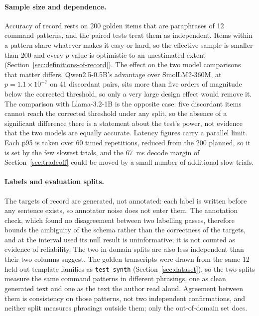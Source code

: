 \paragraph{Sample size and dependence.} Accuracy of record rests on 200 golden items that are
paraphrases of 12 command patterns, and the paired tests treat them as independent. Items within a
pattern share whatever makes it easy or hard, so the effective sample is smaller than 200 and every
$p$-value is optimistic to an unestimated extent (Section~\ref{sec:definitions-of-record}). The
effect on the two model comparisons that matter differs. Qwen2.5-0.5B's advantage over
SmolLM2-360M, at $p = 1.1 \times 10^{-7}$ on 41 discordant pairs, sits more than five orders of
magnitude below the corrected threshold, so only a very large design effect would remove it. The
comparison with Llama-3.2-1B is the opposite case: five discordant items cannot reach the corrected
threshold under any split, so the absence of a significant difference there is a statement about
the test's power, not evidence that the two models are equally accurate. Latency figures carry a
parallel limit. Each p95 is taken over 60 timed repetitions, reduced from the 200 planned, so it is
set by the few slowest trials, and the 67~ms decode margin of Section~\ref{sec:tradeoff} could
be moved by a small number of additional slow trials.

\paragraph{Labels and evaluation splits.} The targets of record are generated, not annotated:
each label is written before any sentence exists, so annotator noise does not enter them. The
annotation check, which found no disagreement between two labelling passes, therefore bounds the
ambiguity of the schema rather than the correctness of the targets, and at the interval used its
null result is uninformative; it is not counted as evidence of reliability. The two in-domain
splits are also less independent than their two columns suggest. The golden transcripts were drawn
from the same 12 held-out template families as \texttt{test\_synth} (Section~\ref{sec:dataset}),
so the two splits measure the same command patterns in different phrasings, one as clean generated
text and one as the text the author read aloud. Agreement between them is consistency on those patterns, not two
independent confirmations, and neither split measures phrasings outside them; only the
out-of-domain set does.

